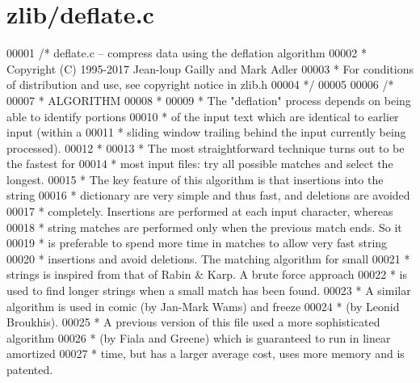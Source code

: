 \hypertarget{zlib_2deflate_8c_source}{}\section{zlib/deflate.c}
\label{zlib_2deflate_8c_source}

\begin{DoxyCode}
00001 \textcolor{comment}{/* deflate.c -- compress data using the deflation algorithm}
00002 \textcolor{comment}{ * Copyright (C) 1995-2017 Jean-loup Gailly and Mark Adler}
00003 \textcolor{comment}{ * For conditions of distribution and use, see copyright notice in zlib.h}
00004 \textcolor{comment}{ */}
00005 
00006 \textcolor{comment}{/*}
00007 \textcolor{comment}{ *  ALGORITHM}
00008 \textcolor{comment}{ *}
00009 \textcolor{comment}{ *      The "deflation" process depends on being able to identify portions}
00010 \textcolor{comment}{ *      of the input text which are identical to earlier input (within a}
00011 \textcolor{comment}{ *      sliding window trailing behind the input currently being processed).}
00012 \textcolor{comment}{ *}
00013 \textcolor{comment}{ *      The most straightforward technique turns out to be the fastest for}
00014 \textcolor{comment}{ *      most input files: try all possible matches and select the longest.}
00015 \textcolor{comment}{ *      The key feature of this algorithm is that insertions into the string}
00016 \textcolor{comment}{ *      dictionary are very simple and thus fast, and deletions are avoided}
00017 \textcolor{comment}{ *      completely. Insertions are performed at each input character, whereas}
00018 \textcolor{comment}{ *      string matches are performed only when the previous match ends. So it}
00019 \textcolor{comment}{ *      is preferable to spend more time in matches to allow very fast string}
00020 \textcolor{comment}{ *      insertions and avoid deletions. The matching algorithm for small}
00021 \textcolor{comment}{ *      strings is inspired from that of Rabin & Karp. A brute force approach}
00022 \textcolor{comment}{ *      is used to find longer strings when a small match has been found.}
00023 \textcolor{comment}{ *      A similar algorithm is used in comic (by Jan-Mark Wams) and freeze}
00024 \textcolor{comment}{ *      (by Leonid Broukhis).}
00025 \textcolor{comment}{ *         A previous version of this file used a more sophisticated algorithm}
00026 \textcolor{comment}{ *      (by Fiala and Greene) which is guaranteed to run in linear amortized}
00027 \textcolor{comment}{ *      time, but has a larger average cost, uses more memory and is patented.}

\end{DoxyCode}
